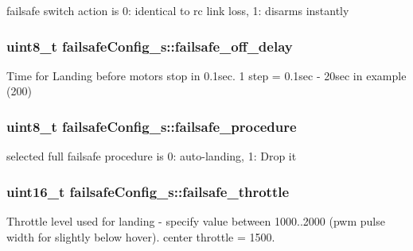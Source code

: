 failsafe switch action is 0\+: identical to rc link loss, 1\+: disarms instantly 

\hypertarget{structfailsafeConfig__s_a7dea3f5b2c7e063f86a7eb854a636f11}{
\subsubsection[{failsafe\+\_\+off\+\_\+delay}]{\setlength{\rightskip}{0pt plus 5cm}uint8\+\_\+t failsafe\+Config\+\_\+s\+::failsafe\+\_\+off\+\_\+delay}}\label{structfailsafeConfig__s_a7dea3f5b2c7e063f86a7eb854a636f11}


Time for Landing before motors stop in 0.\+1sec. 1 step = 0.\+1sec -\/ 20sec in example (200) 

\hypertarget{structfailsafeConfig__s_a306c835be29095a96a2bd376860da270}{
\subsubsection[{failsafe\+\_\+procedure}]{\setlength{\rightskip}{0pt plus 5cm}uint8\+\_\+t failsafe\+Config\+\_\+s\+::failsafe\+\_\+procedure}}\label{structfailsafeConfig__s_a306c835be29095a96a2bd376860da270}


selected full failsafe procedure is 0\+: auto-\/landing, 1\+: Drop it 

\hypertarget{structfailsafeConfig__s_a4b281394340a52b19f9b655c2108ef82}{
\subsubsection[{failsafe\+\_\+throttle}]{\setlength{\rightskip}{0pt plus 5cm}uint16\+\_\+t failsafe\+Config\+\_\+s\+::failsafe\+\_\+throttle}}\label{structfailsafeConfig__s_a4b281394340a52b19f9b655c2108ef82}


Throttle level used for landing -\/ specify value between 1000..2000 (pwm pulse width for slightly below hover). center throttle = 1500. 

